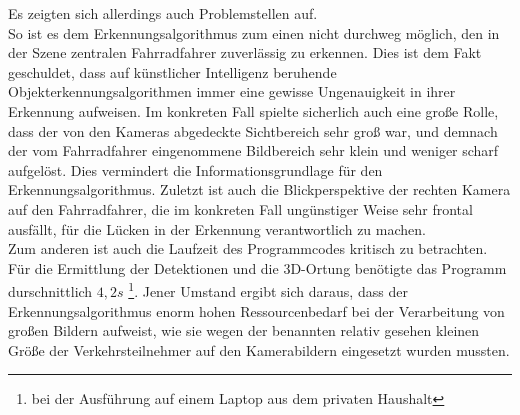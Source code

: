 \noindent Es zeigten sich allerdings auch Problemstellen auf.\\
So ist es dem Erkennungsalgorithmus zum einen nicht durchweg möglich, den in der Szene zentralen Fahrradfahrer zuverlässig zu erkennen. Dies ist dem Fakt geschuldet, dass auf künstlicher Intelligenz beruhende Objekterkennungsalgorithmen immer eine gewisse Ungenauigkeit in ihrer Erkennung aufweisen. Im konkreten Fall spielte sicherlich auch eine große Rolle, dass der von den Kameras abgedeckte Sichtbereich sehr groß war, und demnach der vom Fahrradfahrer eingenommene Bildbereich sehr klein und weniger scharf aufgelöst. Dies vermindert die Informationsgrundlage für den Erkennungsalgorithmus. Zuletzt ist auch die Blickperspektive der rechten Kamera auf den Fahrradfahrer, die im konkreten Fall ungünstiger Weise sehr frontal ausfällt, für die Lücken in der Erkennung verantwortlich zu machen.\\
Zum anderen ist auch die Laufzeit des Programmcodes kritisch zu betrachten. Für die Ermittlung der Detektionen und die 3D-Ortung benötigte das Programm durschnittlich $4,2s$ \footnote{bei der Ausführung auf einem Laptop aus dem privaten Haushalt}. Jener Umstand ergibt sich daraus, dass der Erkennungsalgorithmus enorm hohen Ressourcenbedarf bei der Verarbeitung von großen Bildern aufweist, wie sie wegen der benannten relativ gesehen kleinen Größe der Verkehrsteilnehmer auf den Kamerabildern eingesetzt wurden mussten.\kleinerabstand
